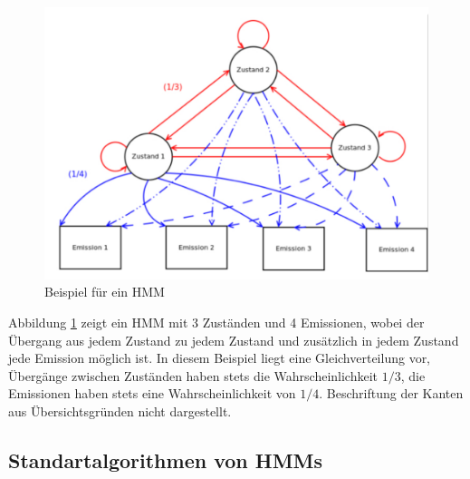 \begin{figure}[H]
	\centering
	\includegraphics[width=1\textwidth]{bilder/02_hmm.pdf}
	\caption{Beispiel für ein HMM}
	\label{fig:hmm}
\end{figure}
Abbildung \ref{fig:hmm} zeigt ein HMM mit 3 Zuständen und 4 Emissionen, wobei der Übergang aus jedem Zustand zu jedem Zustand und zusätzlich in jedem Zustand jede Emission möglich ist.
In diesem Beispiel liegt eine Gleichverteilung vor, Übergänge zwischen Zuständen haben stets die Wahrscheinlichkeit $1/3$, die Emissionen haben stets eine Wahrscheinlichkeit von $1/4$.
Beschriftung der Kanten aus Übersichtsgründen nicht dargestellt.

\subsection{Standartalgorithmen von HMMs}
\label{sec:standartalgorithmenHMM}

